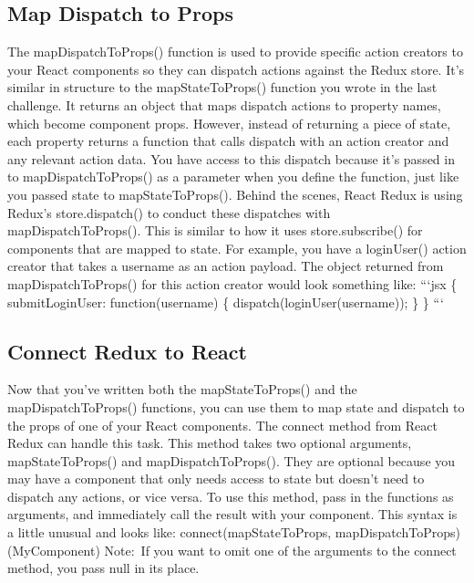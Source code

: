 \documentclass{article}%
\begin{document}
\subsection{Map Dispatch to Props}%
\label{subsec:MapDispatchtoProps}%
The mapDispatchToProps() function is used to provide specific action creators to your React components so they can dispatch actions against the Redux store. It's similar in structure to the mapStateToProps() function you wrote in the last challenge. It returns an object that maps dispatch actions to property names, which become component props. However, instead of returning a piece of state, each property returns a function that calls dispatch with an action creator and any relevant action data. You have access to this dispatch because it's passed in to mapDispatchToProps() as a parameter when you define the function, just like you passed state to mapStateToProps(). Behind the scenes, React Redux is using Redux's store.dispatch() to conduct these dispatches with mapDispatchToProps(). This is similar to how it uses store.subscribe() for components that are mapped to state.\newline%
For example, you have a loginUser() action creator that takes a username as an action payload. The object returned from mapDispatchToProps() for this action creator would look something like:\newline%
```jsx\newline%
\{\newline%
  submitLoginUser: function(username) \{\newline%
    dispatch(loginUser(username));\newline%
  \}\newline%
\}\newline%
```\newline%

%
\subsection{Connect Redux to React}%
\label{subsec:ConnectReduxtoReact}%
Now that you've written both the mapStateToProps() and the mapDispatchToProps() functions, you can use them to map state and dispatch to the props of one of your React components. The connect method from React Redux can handle this task. This method takes two optional arguments, mapStateToProps() and mapDispatchToProps(). They are optional because you may have a component that only needs access to state but doesn't need to dispatch any actions, or vice versa.\newline%
To use this method, pass in the functions as arguments, and immediately call the result with your component. This syntax is a little unusual and looks like:\newline%
connect(mapStateToProps, mapDispatchToProps)(MyComponent)\newline%
Note:~If you want to omit one of the arguments to the connect method, you pass null in its place.\newline%
\end{document}
